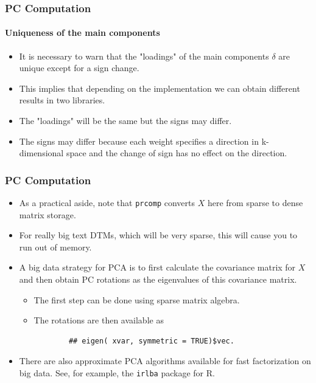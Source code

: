 \documentclass[
  shownotes,
  xcolor={svgnames},
  hyperref={colorlinks,citecolor=DarkBlue,linkcolor=DarkRed,urlcolor=DarkBlue}
  , aspectratio=169]{beamer}
\begin{document}
\begin{frame}[fragile]
\frametitle{PC Computation}
\framesubtitle{Uniqueness of the main components}

\begin{itemize}
  \item It is necessary to warn that the "loadings" of the main components $\delta$ are unique except for a sign change. 
  \medskip
  \item This implies that depending on the implementation we can obtain different results in two libraries. 
  \medskip
  \item The "loadings" will be the same but the signs may differ. 
  \medskip
  \item The signs may differ because each weight specifies a direction in k-dimensional space and the change of sign has no effect on the direction.
\end{itemize}

\end{frame}
\begin{frame}[fragile]
\frametitle{PC Computation}


\begin{itemize}


  \item As a practical aside, note that \texttt{prcomp} converts $ X $ here from sparse to dense matrix storage.
  \medskip
  \item For really big text DTMs, which will be very sparse, this will cause you to run out of memory. 
\medskip
  \item A big data strategy for PCA is to first calculate the covariance matrix for $ X $ and then obtain PC rotations as the eigenvalues of this covariance matrix. 
  \medskip
    \begin{itemize}

        \item The first step can be done using sparse matrix algebra. 
        \medskip
        \item The rotations are then available as

        \begin{verbatim}
        ## eigen( xvar, symmetric = TRUE)$vec. 
        \end{verbatim}
    \end{itemize}
    \medskip
  \item There are also approximate PCA algorithms available for fast factorization on big data. See, for example, the \texttt{irlba} package for R. 
  \end{itemize}
\end{frame}
\end{document}
